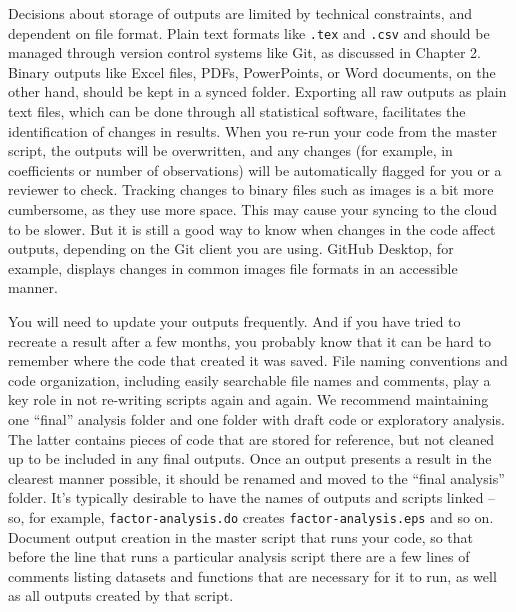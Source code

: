 Decisions about storage of outputs are limited by technical constraints,
and dependent on file format.
Plain text formats like \texttt{.tex} and \texttt{.csv}
and should be managed through version control systems like Git,
as discussed in Chapter 2.
Binary outputs like Excel files, PDFs, PowerPoints, or Word documents,
on the other hand, should be kept in a synced folder.
Exporting all raw outputs as plain text files, 
which can be done through all statistical software,
facilitates the identification of changes in results.
When you re-run your code from the master script,
the outputs will be overwritten,
and any changes (for example, in coefficients or number of observations)
will be automatically flagged for you or a reviewer to check.
Tracking changes to binary files such as images is a bit more cumbersome,
as they use more space.
This may cause your syncing to the cloud to be slower.
But it is still a good way to know when changes in the code affect outputs,
depending on the Git client you are using.
GitHub Desktop, for example,
displays changes in common images file formats
in an accessible manner.

You will need to update your outputs frequently.
And if you have tried to recreate a result after a few months,
you probably know that it can be hard to remember where the code that created it was saved.
File naming conventions and code organization,
including easily searchable file names and comments,
play a key role in not re-writing scripts again and again.
We recommend maintaining one ``final'' analysis folder
and one folder with draft code or exploratory analysis.
The latter contains pieces of code that are stored for reference,
but not cleaned up to be included in any final outputs.
Once an output presents a result in the clearest manner possible,
it should be renamed and moved to the ``final analysis'' folder.
It's typically desirable to have the names of outputs and scripts linked --
so, for example, \texttt{factor-analysis.do} creates \texttt{factor-analysis.eps} and so on.
Document output creation in the master script that runs your code,
so that before the line that runs a particular analysis script
there are a few lines of comments listing
datasets and functions that are necessary for it to run,
as well as all outputs created by that script.


